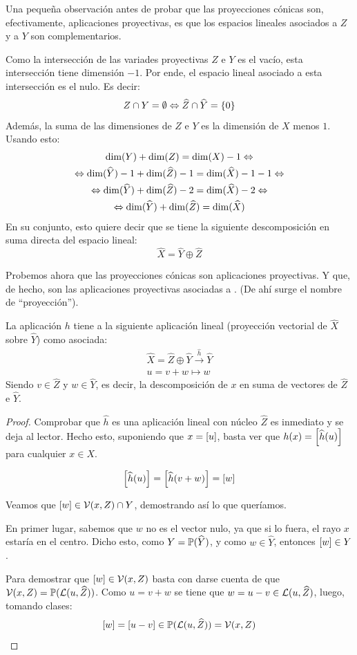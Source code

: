 Una pequeña observación antes de probar que las proyecciones cónicas son, efectivamente, aplicaciones proyectivas, es que los espacios lineales asociados a $Z$ y a $Y$ son complementarios.
\begin{obs}
	\label{C4_obs_espaciosComplementarios}
	Como la intersección de las variades proyectivas $Z$ e $Y$ es el vacío, esta intersección tiene dimensión $-1$. Por ende, el espacio lineal asociado a esta intersección es el nulo. Es decir:
	\[Z\cap Y=\emptyset\Leftrightarrow\widehat{Z}\cap\widehat{Y}=\{0\}\]
	Además, la suma de las dimensiones de $Z$ e $Y$ es la dimensión de $X$ menos $1$. Usando esto:
	\begin{multline*}
		\dim(Y)+\dim(Z)=\dim(X)-1\Leftrightarrow\\
		\Leftrightarrow \dim(\widehat{Y})-1+\dim(\widehat{Z})-1=\dim(\widehat{X})-1-1\Leftrightarrow\\
		\Leftrightarrow \dim(\widehat{Y})+\dim(\widehat{Z})-2=\dim(\widehat{X})-2\Leftrightarrow\\
		\Leftrightarrow \dim(\widehat{Y})+\dim(\widehat{Z})=\dim(\widehat{X})
	\end{multline*}
	En su conjunto, esto quiere decir que se tiene la siguiente descomposición en suma directa del espacio lineal:
	\[\widehat{X}=\widehat{Y}\oplus\widehat{Z}\]
\end{obs}
Probemos ahora que las proyecciones cónicas son aplicaciones proyectivas. Y que, de hecho, son las aplicaciones proyectivas asociadas a . (De ahí surge el nombre de ``proyección'').
\begin{prop}
	\label{C4_prop_proyeccionVectorial}
	La aplicación $h$ tiene a la siguiente aplicación lineal (proyección vectorial de $\widehat{X}$ sobre $\widehat{Y}$) como asociada:
	\[\begin{array}{c}
	\widehat{X}=\widehat{Z}\oplus\widehat{Y}\stackrel{\widehat{h}}{\to}\widehat{Y}\\
	u=v+w\mapsto w
	\end{array}\]
	Siendo $v\in \widehat{Z}$ y $w\in \widehat{Y}$, es decir, la descomposición de $x$ en suma de vectores de $\widehat{Z}$ e $\widehat{Y}$.
\end{prop}
\begin{proof}
	Comprobar que $\widehat{h}$ es una aplicación lineal con núcleo $\widehat{Z}$ es inmediato y se deja al lector. Hecho esto, suponiendo que $x=\left [ u \right ]$, basta ver que $h(x)=\left [ \widehat{h}(u) \right ]$ para cualquier $x\in X$.
	
	\[\left [ \widehat{h}(u) \right ]=\left [ \widehat{h}(v+w) \right ]=\left [ w \right ]\]
	
	Veamos que $\left [ w \right ]\in \mathcal{V}(x,Z)\cap Y$, demostrando así lo que queríamos.
	
	En primer lugar, sabemos que $w$ no es el vector nulo, ya que si lo fuera, el rayo $x$ estaría en el centro. Dicho esto, como $Y=\mathbb{P}(\widehat{Y})$, y como $w\in\widehat{Y}$, entonces $\left [ w \right ]\in Y$.
	
	Para demostrar que $\left [ w \right ]\in\mathcal{V}(x,Z)$ basta con darse cuenta de que $\mathcal{V}(x,Z)=\mathbb{P}({\mathcal{L}(u,\widehat{Z})})$. Como $u = v+w$ se tiene que $w=u-v\in\mathcal{L}(u, \widehat{Z})$, luego, tomando clases: \[\left [ w \right ]=\left [ u-v \right ]\in\mathbb{P}(\mathcal{L}(u,\widehat{Z}))=\mathcal{V}(x,Z)\]
\end{proof}
